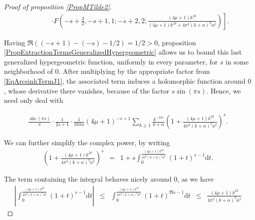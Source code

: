 \documentclass{jams-l}
\theoremstyle{definition}
\theoremstyle{remark}
\numberwithin{equation}{section}
\begin{document}
\begin{proof}[Proof of proposition \ref{PropMTilde2}]
\[\begin{array}{lll}
                                && \qquad \scriptstyle \left. \cdot F \left( -s + \frac{3}{2}, -s+1, 1; -s+2, 2;  \frac{\left( 4 \mu + 1 \right) k^{2 \delta}}{\left( 4 \mu + 1 \right) k^{2 \delta} + 4 \pi^2 \left( k + \alpha \right)^2 a^2} \right) \right].
                            \end{array} \]
                        
                        \noindent Having $\Re \left( \left( -s+1 \right) - \left( -s \right) - 1/2 \right) = 1/2 > 0$, proposition \ref{PropExtractionTermsGeneralizedHypergeometric} allows us to bound this last generalized hypergeometric function, uniformly in every parameter, for $s$ in some neighborhood of $0$. After multiplying by the appropriate factor from \eqref{EqArcsinhTermJ1}, the associated term induces a holomorphic function around $0$, whose derivative there vanishes, because of the factor $s \sin \left( \pi s \right)$. Hence, we need only deal with
                        
                        \[ \begin{array}{c}
                                \frac{\sin \left( \pi s \right)}{\pi} \cdot \frac{1}{2s+1} \cdot \frac{1}{16 \pi a} \left( 4 \mu + 1 \right)^{-s+1} \sum\limits_{k \geqslant 1} \frac{k^{-2 \delta s}}{k + \alpha} \left( 1 + \frac{\left( 4 \mu + 1 \right) k^{2 \delta}}{4 \pi^2 \left( k + \alpha \right)^2 a^2} \right)^s.
                            \end{array} \]
                        
                        \noindent We can further simplify the complex power, by writing
                        \[ \begin{array}{lll}
                                \left( 1 + \frac{\left( 4 \mu + 1 \right) k^{2 \delta}}{4 \pi^2 \left( k + \alpha \right)^2 a^2} \right)^s & = & 1 + s \int_0^{\frac{\left( 4 \mu + 1 \right) k^{2 \delta}}{4 \pi^2 \left( k + \alpha \right)^2 a^2}} \left( 1 + t \right)^{s-1} \mathrm{d}t.
                            \end{array} \]
                        
                        \noindent The term containing the integral behaves nicely around $0$, as we have
                        \[ \begin{array}{lllll}
                                \left \vert \int_0^{\frac{\left( 4 \mu + 1 \right) k^{2 \delta}}{4 \pi^2 \left( k + \alpha \right)^2 a^2}} \left( 1 + t \right)^{s-1} \mathrm{d}t \right \vert & \leqslant & \int_0^{\frac{\left( 4 \mu + 1 \right) k^{2 \delta}}{4 \pi^2 \left( k + \alpha \right)^2 a^2}} \left( 1 + t \right)^{\Re s-1} \mathrm{d}t & \leqslant & \frac{\left( 4 \mu + 1 \right) k^{2 \delta}}{4 \pi^2 \left( k + \alpha \right)^2 a^2}
                            \end{array} \]
                        

\end{proof}
\end{document}
